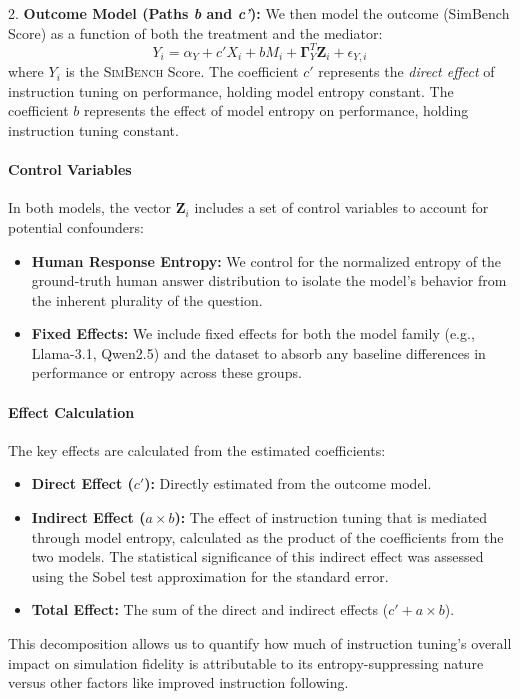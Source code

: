 \documentclass{article} %
\begin{document}
2.  \textbf{Outcome Model (Paths \textit{b} and \textit{c'}):} We then model the outcome (SimBench Score) as a function of both the treatment and the mediator:
    \begin{equation}
    Y_i = \alpha_Y + c' X_i + b M_i + \mathbf{\Gamma}_Y^T \mathbf{Z}_i + \epsilon_{Y,i}
    \end{equation}
    where $Y_i$ is the \textsc{SimBench} Score. The coefficient $c'$ represents the \textit{direct effect} of instruction tuning on performance, holding model entropy constant. The coefficient $b$ represents the effect of model entropy on performance, holding instruction tuning constant.

\paragraph{Control Variables}
In both models, the vector $\mathbf{Z}_i$ includes a set of control variables to account for potential confounders:
\begin{itemize}[nosep, leftmargin=*]
    \item \textbf{Human Response Entropy:} We control for the normalized entropy of the ground-truth human answer distribution to isolate the model's behavior from the inherent plurality of the question.
    \item \textbf{Fixed Effects:} We include fixed effects for both the model family (e.g., Llama-3.1, Qwen2.5) and the dataset to absorb any baseline differences in performance or entropy across these groups.
\end{itemize}

\paragraph{Effect Calculation}
The key effects are calculated from the estimated coefficients:
\begin{itemize}[nosep, leftmargin=*]
    \item \textbf{Direct Effect ($c'$):} Directly estimated from the outcome model.
    \item \textbf{Indirect Effect ($a \times b$):} The effect of instruction tuning that is mediated through model entropy, calculated as the product of the coefficients from the two models. The statistical significance of this indirect effect was assessed using the Sobel test approximation for the standard error.
    \item \textbf{Total Effect:} The sum of the direct and indirect effects ($c' + a \times b$).
\end{itemize}
This decomposition allows us to quantify how much of instruction tuning's overall impact on simulation fidelity is attributable to its entropy-suppressing nature versus other factors like improved instruction following.
\end{document}
